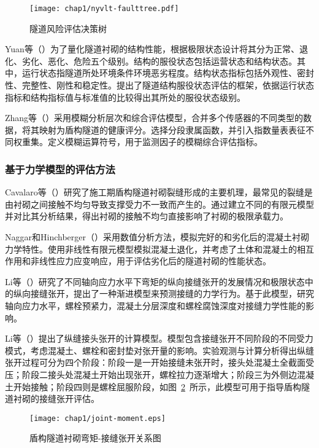\begin{figure}[!h]
	\centering
	\texttt{[image: chap1/nyvlt-faulttree.pdf]}
	\caption{隧道风险评估决策树}
	\label{fig:隧道风险评估决策树}
\end{figure}

Yuan等（\citeyear{Yuan2012Assessment}）为了量化隧道衬砌的结构性能，根据极限状态设计将其分为正常、退化、劣化、恶化、危险五个级别。结构的服役状态包括运营状态和结构状态。其中，运行状态指隧道所处环境条件环境恶劣程度。结构状态指标包括外观性、密封性、完整性、刚性和稳定性。提出了隧道结构服役状态评估的框架，依据运行状态指标和结构指标值与标准值的比较得出其所处的服役状态级别。

Zhang等（\citeyear{Zhang2014Fuzzy}）采用模糊分析层次和综合评估模型，合并多个传感器的不同类型的数据，将其映射为盾构隧道的健康评分。选择分段隶属函数，并引入指数量表表征不同权重集。定义模糊运算符号，用于监测因子的模糊综合评估指标。

\subsubsection{基于力学模型的评估方法}

Cavalaro等（\citeyear{Cavalaro2011Structural}）研究了施工期盾构隧道衬砌裂缝形成的主要机理，最常见的裂缝是由衬砌之间接触不均匀导致支撑受力不一致而产生的。通过建立不同的有限元模型并对比其分析结果，得出衬砌的接触不均匀直接影响了衬砌的极限承载力。

Naggar和Hinchberger（\citeyear{Naggar2012Approximate}）采用数值分析方法，模拟完好的和劣化后的混凝土衬砌力学特性。使用非线性有限元模型模拟混凝土退化，并考虑了土体和混凝土的相互作用和非线性应力应变响应，用于评估劣化后的隧道衬砌的性能状态。

Li等（\citeyear{Li2015Experimental}）研究了不同轴向应力水平下弯矩的纵向接缝张开的发展情况和极限状态中的纵向接缝张开，提出了一种渐进模型来预测接缝的力学行为。基于此模型，研究轴向应力水平，螺栓预紧力，混凝土分层深度和螺栓腐蚀深度对接缝力学性能的影响。

Li等（\citeyear{Li2015A}）提出了纵缝接头张开的计算模型。模型包含接缝张开不同阶段的不同受力模式，考虑混凝土、螺栓和密封垫对张开量的影响。实验观测与计算分析得出纵缝张开过程可分为四个阶段：阶段一是一开始接缝未张开时，接头处混凝土全截面受压；阶段二接头处混凝土开始出现张开，螺栓拉力逐渐增大；阶段三为外侧边混凝土开始接触；阶段四则是螺栓屈服阶段，如图~\ref{fig:接缝张开与弯矩}~所示，此模型可用于指导盾构隧道衬砌的接缝张开评估。

\begin{figure}[!h]
	\centering
	\texttt{[image: chap1/joint-moment.eps]}
	\caption{盾构隧道衬砌弯矩-接缝张开关系图}
	\label{fig:接缝张开与弯矩}
\end{figure}

